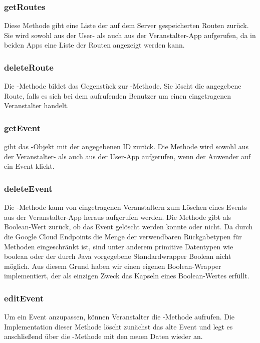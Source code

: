 \subsubsection*{getRoutes}
Diese Methode gibt eine Liste der auf dem Server gespeicherten Routen zurück. Sie wird sowohl aus der User- als auch aus der Veranstalter-App aufgerufen, da in beiden Apps eine Liste der Routen angezeigt werden kann.

\subsubsection*{deleteRoute}
Die -Methode bildet das Gegenstück zur -Methode. Sie löscht die angegebene Route, falls es sich bei dem aufrufenden Benutzer um einen eingetragenen Veranstalter handelt.

\subsubsection*{getEvent}
 gibt das -Objekt mit der angegebenen ID zurück. Die Methode wird sowohl aus der Veranstalter- als auch aus der User-App aufgerufen, wenn der Anwender auf ein Event klickt.

\subsubsection*{deleteEvent}
Die -Methode kann von eingetragenen Veranstaltern zum Löschen eines Events aus der Veranstalter-App heraus aufgerufen werden. Die Methode gibt als Boolean-Wert zurück, ob das Event gelöscht werden konnte oder nicht. Da durch die Google Cloud Endpoints die Menge der verwendbaren Rückgabetypen für Methoden eingeschränkt ist, sind unter anderem primitive Datentypen wie boolean oder der durch Java vorgegebene Standardwrapper Boolean nicht möglich. Aus diesem Grund haben wir einen eigenen Boolean-Wrapper implementiert, der als einzigen Zweck das Kapseln eines Boolean-Wertes erfüllt.

\subsubsection*{editEvent}
Um ein Event anzupassen, können Veranstalter die -Methode aufrufen. Die Implementation dieser Methode löscht zunächst das alte Event und legt es anschließend über die -Methode mit den neuen Daten wieder an.

